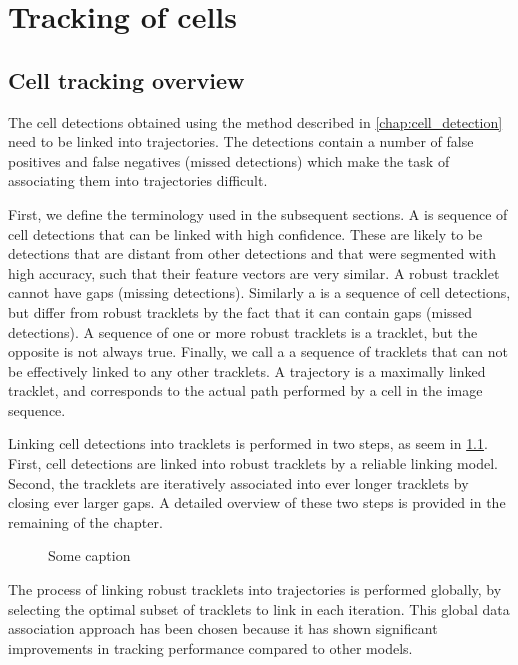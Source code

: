 \chapter{Tracking of cells \statusfirstdraft}
	\label{chap:tracking}
	
	\section{Cell tracking overview \statusfirstdraft}
	
		The cell detections obtained using the method described in \cref{chap:cell_detection} need to be linked into trajectories. The detections contain a number of false positives and false negatives (missed detections) which make the task of associating them into trajectories difficult.
		
		First, we define the terminology used in the subsequent sections. A  is sequence of cell detections that can be linked with high confidence. These are likely to be detections that are distant from other detections and that were segmented with high accuracy, such that their feature vectors are very similar. A robust tracklet cannot have gaps (missing detections). Similarly a  is a sequence of cell detections, but differ from robust tracklets by the fact that it can contain gaps (missed detections). A sequence of one or more robust tracklets is a tracklet, but the opposite is not always true. Finally, we call a  a sequence of tracklets that can not be effectively linked to any other tracklets. A trajectory is a maximally linked tracklet, and corresponds to the actual path performed by a cell in the image sequence.
		
		Linking cell detections into tracklets is performed in two steps, as seem in \cref{fig:trackingoveriew}. First, cell detections are linked into robust tracklets by a reliable linking model. Second, the tracklets are iteratively  associated into ever longer tracklets by closing ever larger gaps. A detailed overview of these two steps is provided in the remaining of the chapter.
	
		\begin{figure}[h]
			\centering
			\caption{Some caption}
			\label{fig:trackingoveriew}
		\end{figure}
		
		The process of linking robust tracklets into trajectories is performed globally, by selecting the optimal subset of tracklets to link in each iteration. This global data association approach has been chosen because it has shown significant improvements in tracking performance compared to other models. 
		
